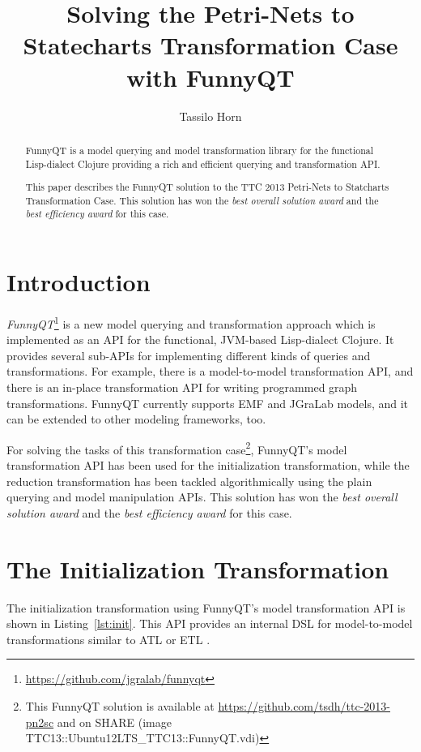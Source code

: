 \documentclass[submission]{eptcs}
\title{Solving the Petri-Nets to Statecharts Transformation Case with FunnyQT}
\author{Tassilo Horn
  \email{horn@uni-koblenz.de}
  \institute{Institute for Software Technology, University Koblenz-Landau, Germany}}
\begin{document}
\maketitle

\begin{abstract}
  FunnyQT is a model querying and model transformation library for the
  functional Lisp-dialect Clojure providing a rich and efficient querying and
  transformation API.

  This paper describes the FunnyQT solution to the TTC 2013 Petri-Nets to
  Statcharts Transformation Case.  This solution has won the \emph{best overall
    solution award} and the \emph{best efficiency award} for this case.
\end{abstract}

\section{Introduction}
\label{sec:introduction}

\emph{FunnyQT}\footnote{\url{https://github.com/jgralab/funnyqt}} is a new
model querying and transformation approach which is implemented as an API for
the functional, JVM-based Lisp-dialect Clojure.  It provides several sub-APIs
for implementing different kinds of queries and transformations.  For example,
there is a model-to-model transformation API, and there is an in-place
transformation API for writing programmed graph transformations.  FunnyQT
currently supports EMF and JGraLab models, and it can be extended to other
modeling frameworks, too.

For solving the tasks of this transformation case\footnote{This FunnyQT
  solution is available at \url{https://github.com/tsdh/ttc-2013-pn2sc} and on
  SHARE (image
  \textsf{TTC13::Ubuntu12LTS\_TTC13::FunnyQT.vdi})\label{fn:github}}, FunnyQT's
model transformation API has been used for the initialization transformation,
while the reduction transformation has been tackled algorithmically using the
plain querying and model manipulation APIs.  This solution has won the
\emph{best overall solution award} and the \emph{best efficiency award} for
this case.

\section{The Initialization Transformation}
\label{sec:init-transformation}

The initialization transformation using FunnyQT's model transformation API is
shown in Listing~\ref{lst:init}.  This API provides an internal DSL
\cite{book:Fowler2010DSL} for model-to-model transformations similar to ATL
\cite{ATL05} or ETL \cite{booklet:epsilon}.
\end{document}
